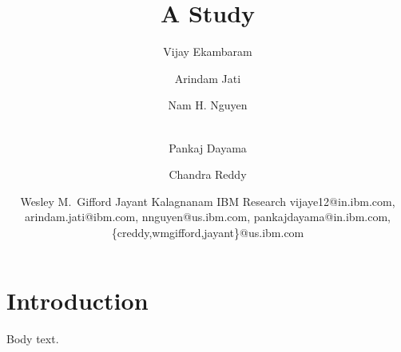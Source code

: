 \documentclass{article}
\title{A Study}
\author{
    Vijay Ekambaram \and Arindam Jati \and Nam H. Nguyen \and \\
    Pankaj Dayama \and Chandra Reddy \and Wesley M.~Gifford \And Jayant Kalagnanam
    \affiliations
    IBM Research
    \emails
    vijaye12@in.ibm.com, arindam.jati@ibm.com, nnguyen@us.ibm.com,
    pankajdayama@in.ibm.com,\{creddy,wmgifford,jayant\}@us.ibm.com
}
\begin{document}
\maketitle
\section{Introduction}
Body text.
\end{document}
